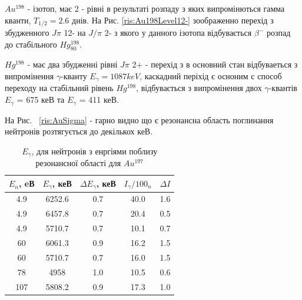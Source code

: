 \documentclass[a4paper, 14pt]{article}
\numberwithin{equation}{section}
\numberwithin{table}{section}
\begin{document}
$Au^{198} $ - ізотоп, має 2 - рівні в результаті розпаду з яких випромінються гамма кванти, $T_{1/2} = 2.6$ днів. На Рис. \ref{ris:Au198Level12-} зоображенно перехід з збудженного $J\pi$ 12- на $J/\pi$ 2- з якого у данного ізотопа відбувається $\beta^-$ розпад до стабільного $Hg^{198}_{80}$.

$Hg^{198}$ - має два збудженні рівні $J\pi$ 2+ - перехід з  в основний стан відбуваеться з випромінення $\gamma$-кванту $E_\gamma=1087keV$, каскадний періхід є осноним с способ переходу на стабільний рівень $Hg^{198}$, відбувається з випромінення двох $\gamma$-квантів $E_\gamma$ = 675 кеВ та $E_\gamma$ = 411 кеВ. 

На Рис. ~\ref{ris:AuSigma} - гарно видно що є резонансна область поглинання нейтронів розтягується до декількох кеВ. 
\begin{table}[h]
	\centering
	\begin{tabular}{|c|c|c|c|c|} 
		\hline
			$E_{n}$, eВ&$E_{\gamma}$, кеВ & $\Delta{E_{\gamma}}$, кеВ & $I_{\gamma} / 100_n$ & $\Delta{I}$ \\
		\hline
		4.9 & 6252.6 & 0.7 & 40.0 & 1.6 \\
		\hline
		4.9 & 6457.8 & 0.7 & 20.4 & 0.5\\	
		\hline
		4.9 & 5710.7 & 0.7 & 10.1 & 0.7 \\	
		\hline	%
		60 & 6061.3 & 0.9 & 16.2 & 1.5 \\	
		\hline %
		60 & 5710.7 & 0.7 & 16.0 & 1.5 \\	
		\hline %
		78 & 4958 & 1.0 & 10.5 & 0.6\\	
		\hline%
		107 & 5808.2 & 0.9 & 17.3 & 1.0 \\	
		\hline
	\end{tabular}
	\caption{$E_\gamma$, для нейтронів з енргіями поблизу резонансної області для $Au^{197}$} 
	\label{tabl:AuNeutronAbsorption}
\end{table}
\end{document}
